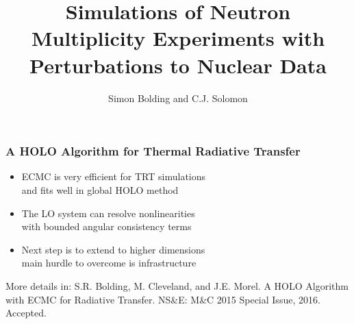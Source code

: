 \documentclass[xcolor=dvipsnames,hyperref={pdfpagelabels=false},unknownkeysallowed]{beamer}
\newcommand{\colG}[1]{{\color{Gray!110} #1}}
\newlength{\wideitemsep}
\let\olditem\item
\renewcommand{\item}{\setlength{\itemsep}{\wideitemsep}\olditem}
\newcommand{\shorttitle}{\color{black} A HOLO Algorithm for Thermal Radiative Transfer
    \makebox[\linewidth]{\rule{\textwidth}{5pt}}
}
\begin{document}
\begin{frame}
    \frametitle{\shorttitle}
    \begin{itemize}
        \item[] ECMC is very efficient for TRT simulations\\
            \colG{and fits well in global HOLO method}
        \item[] The LO system can resolve nonlinearities \\
            \colG{with bounded angular consistency terms}
        \item[] Next step is to extend to higher dimensions \\
            \colG{main hurdle to overcome is infrastructure}
    \end{itemize} \pause
    \begin{tcolorbox}
    More details in: S.R. Bolding, M. Cleveland, and J.E. Morel. A HOLO Algorithm
with ECMC for Radiative Transfer. NS\&E: M\&C 2015 Special Issue, 2016. Accepted.
\end{tcolorbox}
\end{frame}


\title{Simulations of Neutron Multiplicity Experiments with Perturbations to Nuclear Data}
    \author{Simon Bolding and C.J. Solomon}
\begin{frame}
    \maketitle
\end{frame}
\end{document}
